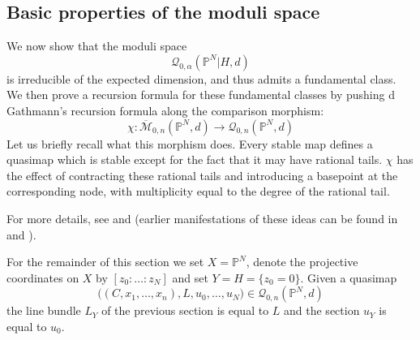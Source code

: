 \documentclass[11pt]{amsart}
\newcommand{\M}[4]{\overline{\mathcal{M}}_{#1,#2}(#3,#4)}
\newcommand{\Q}[4]{\mathcal{Q}_{#1,#2}(#3,#4)}
\newcommand{\PP}{\mathbb P}
\renewcommand{\to}{\rightarrow}
\theoremstyle{definition}
\theoremstyle{definition}
\begin{document}
\subsection{Basic properties of the moduli space} \label{Subsection basic properties of the moduli space}
We now show that the moduli space
\begin{equation*} \Q{0}{\alpha}{\PP^N|H}{d} \end{equation*}
is irreducible of the expected dimension, and thus admits a fundamental class. We then prove a recursion formula for these fundamental classes by pushing d Gathmann's recursion formula along the comparison morphism:
\begin{equation*}\chi : \M{0}{n}{\PP^N}{d} \to \Q{0}{n}{\PP^N}{d} \end{equation*}
Let us briefly recall what this morphism does. Every stable map defines a quasimap which is stable except for the fact that it may have rational tails. $\chi$ has the effect of contracting these rational tails and introducing a basepoint at the corresponding node, with multiplicity equal to the degree of the rational tail. 


For more details, see \cite[Theorem 3]{MOP} and \cite[Section 4.3]{Manolache-Push} (earlier manifestations of these ideas can be found in \cite{Bertram} and \cite{Popa-Roth}).

For the remainder of this section we set $X=\PP^N$, denote the projective coordinates on $X$ by $[z_0: \ldots: z_N]$ and set $Y=H=\{ z_0 = 0 \}$. Given a quasimap
\begin{equation*} \big((C,x_1,\ldots,x_n), L, u_0,\ldots,u_N\big) \in \Q{0}{n}{\PP^N}{d} \end{equation*}
the line bundle $L_Y$ of the previous section is equal to $L$ and the section $u_Y$ is equal to $u_0$.
\end{document}
